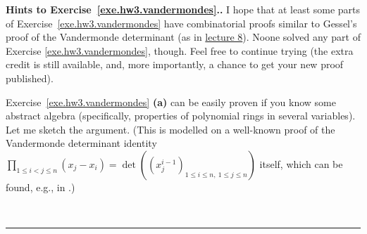 \documentclass[numbers=enddot,12pt,final,onecolumn,notitlepage]{scrartcl}%
\theoremstyle{definition}
\newenvironment{proof}[1][Proof]{\noindent\textbf{#1.} }{\ \rule{0.5em}{0.5em}}
\let\prodnonlimits\prod
\renewcommand{\prod}{\prodnonlimits\limits}
\newcommand{\tup}[1]{\left( #1 \right)}
\begin{document}
\begin{proof}[Hints to Exercise~\ref{exe.hw3.vandermondes}.]
I hope that at least some parts of Exercise~\ref{exe.hw3.vandermondes}
have combinatorial proofs similar to Gessel's proof of the Vandermonde
determinant (as in
\href{http://www.cip.ifi.lmu.de/~grinberg/t/17s/5707lec8.pdf}{lecture 8}).
Noone solved any part of Exercise \ref{exe.hw3.vandermondes}, though.
Feel free to continue trying (the extra credit is still available,
and, more importantly, a chance to get your new proof published).

Exercise~\ref{exe.hw3.vandermondes} \textbf{(a)} can be easily
proven if you know some abstract algebra (specifically, properties of
polynomial rings in several variables). Let me sketch the argument.
(This is modelled on a well-known proof of the Vandermonde determinant
identity
$\prod_{1\leq i<j\leq n} \left( x_j - x_i \right)
 =
 \det \tup{ \tup{ x_j^{i-1} }_{1\leq i\leq n, \  1\leq j\leq n } }$
itself, which can be found, e.g., in \cite[\S 17]{Garret10}.)


\end{proof}
\end{document}

